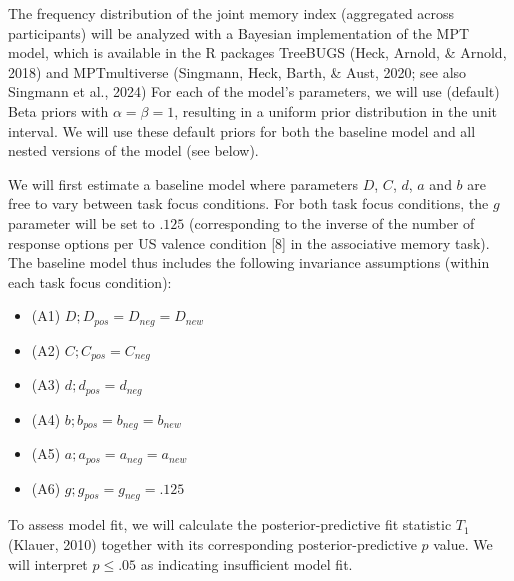 \documentclass[
  doc,floatsintext]{apa6}
\begin{document}
The frequency distribution of the joint memory index (aggregated across participants) will be analyzed with
a Bayesian implementation of the MPT model, which is available in the R packages TreeBUGS (Heck, Arnold, \& Arnold, 2018) and MPTmultiverse (Singmann, Heck, Barth, \& Aust, 2020; see also Singmann et al., 2024)
For each of the model's parameters, we will use (default) Beta priors with \(\alpha = \beta = 1\),
resulting in a uniform prior distribution in the unit interval.
We will use these default priors for both the baseline model and all nested versions of the model (see below).

We will first estimate a baseline model where parameters \(D\), \(C\), \(d\), \(a\) and \(b\) are free to vary between task focus conditions.
For both task focus conditions, the \(g\) parameter will be set to \(.125\) (corresponding to the inverse of the number of response options per US valence condition {[}8{]} in the associative memory task).
The baseline model thus includes the following invariance assumptions (within each task focus condition):

\begin{itemize}
\item
  (A1) \(D; D_\textit{pos}=D_\textit{neg}=D_\textit{new}\)
\item
  (A2) \(C; C_\textit{pos}=C_\textit{neg}\)
\item
  (A3) \(d; d_\textit{pos}=d_\textit{neg}\)
\item
  (A4) \(b; b_\textit{pos}=b_\textit{neg}=b_\textit{new}\)
\item
  (A5) \(a; a_\textit{pos}=a_\textit{neg}=a_\textit{new}\)
\item
  (A6) \(g; g_\textit{pos}=g_\textit{neg}=.125\)
\end{itemize}

To assess model fit, we will calculate the posterior-predictive fit statistic \(T_1\) (Klauer, 2010) together with its corresponding posterior-predictive \(p\) value.
We will interpret \(p \leq. 05\) as indicating insufficient model fit.
\end{document}
